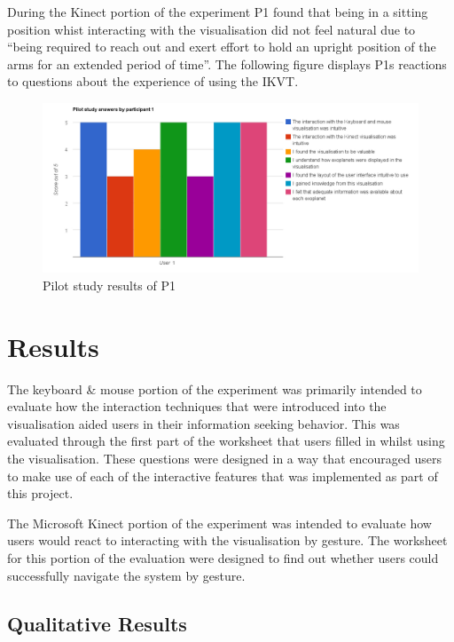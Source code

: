 During the Kinect portion of the experiment P1 found that being in a sitting
position whist interacting with the visualisation did not feel natural due to
``being required to reach out and exert effort to hold an upright position of
the arms for an extended period of time''. The following figure displays P1s
reactions to questions about the experience of using the IKVT.
\begin{figure}[H]
  \centering
      \includegraphics[width=1\textwidth]{images/pilot.jpg}
  \caption{Pilot study results of P1}  
    \label{fig:pilot}
\end{figure}

\section{Results}
The keyboard \& mouse portion of the experiment was primarily intended to
evaluate how the interaction techniques that were introduced into the
visualisation aided users in their information seeking behavior.
This was evaluated through the first part of the worksheet that users filled
in whilst using the visualisation. These questions were designed in a way that
encouraged users to make use of each of the interactive features that was
implemented as part of this project.

The Microsoft Kinect portion of the experiment was intended to evaluate how
users would react to interacting with the visualisation by gesture. The
worksheet for this portion of the evaluation were designed to find out whether
users could successfully navigate the system by gesture.

\subsection{Qualitative Results}
